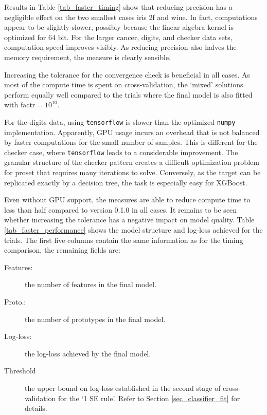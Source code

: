 %
Results in Table \ref{tab_faster_timing} show that reducing precision has a negligible effect on the two smallest cases iris 2f and wine.
In fact, computations appear to be slightly slower, possibly because the linear algebra kernel is optimized for 64 bit.
For the larger cancer, digits, and checker data sets, computation speed improves visibly.
As reducing precision also halves the memory requirement, the measure is clearly sensible.\par
%
Increasing the tolerance for the convergence check is beneficial in all cases.
As most of the compute time is spent on cross-validation, the `mixed' solutions perform equally well compared to the trials where the final model is also fitted with $\text{factr}=10^{10}$.\par
%
For the digits data, using \texttt{tensorflow} is slower than the optimized \texttt{numpy} implementation.
Apparently, GPU usage incurs an overhead that is not balanced by faster computations for the small number of samples.
This is different for the checker case, where \texttt{tensorflow} leads to a considerable improvement.
The granular structure of the checker pattern creates a difficult optimization problem for proset that requires many iterations to solve.
Conversely, as the target can be replicated exactly by a decision tree, the task is especially easy for XGBoost.\par
%
Even without GPU support, the measures are able to reduce compute time to less than half compared to version 0.1.0 in all cases.
It remains to be seen whether increasing the tolerance has a negative impact on model quality.
Table \ref{tab_faster_performance} shows the model structure and log-loss achieved for the trials.
The first five columns contain the same information as for the timing comparison, the remaining fields are:
%
\begin{description}
\item[Features:] the number of features in the final model.
%
\item[Proto.:] the number of prototypes in the final model.
%
\item[Log-loss:] the log-loss achieved by the final model.
%
\item[Threshold] the upper bound on log-loss established in the second stage of cross-validation for the `1 SE rule'.
Refer to Section \ref{sec_classifier_fit} for details.
\end{description}
%
